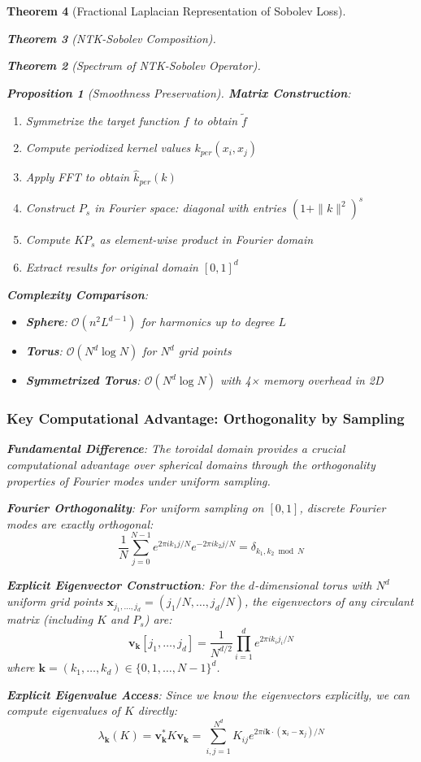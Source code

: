 \documentclass{article}
\newtheorem{theorem}{Theorem}[section]
\newtheorem{proposition}[theorem]{Proposition}
\begin{document}
\begin{theorem}[Fractional Laplacian Representation of Sobolev Loss]
\begin{theorem}[NTK-Sobolev Composition]
\begin{theorem}[Spectrum of NTK-Sobolev Operator]
\begin{proposition}[Smoothness Preservation]
\textbf{Matrix Construction}:
\begin{enumerate}
\item Symmetrize the target function $f$ to obtain $\tilde{f}$
\item Compute periodized kernel values $k_{per}(x_i, x_j)$
\item Apply FFT to obtain $\hat{k}_{per}(k)$
\item Construct $P_s$ in Fourier space: diagonal with entries $(1 + \|k\|^2)^s$
\item Compute $KP_s$ as element-wise product in Fourier domain
\item Extract results for original domain $[0,1]^d$
\end{enumerate}

\textbf{Complexity Comparison}:
\begin{itemize}
\item \textbf{Sphere}: $\mathcal{O}(n^2 L^{d-1})$ for harmonics up to degree $L$
\item \textbf{Torus}: $\mathcal{O}(N^d \log N)$ for $N^d$ grid points
\item \textbf{Symmetrized Torus}: $\mathcal{O}(N^d \log N)$ with 4× memory overhead in 2D
\end{itemize}

\subsubsection{Key Computational Advantage: Orthogonality by Sampling}

\textbf{Fundamental Difference}: The toroidal domain provides a crucial computational advantage over spherical domains through the orthogonality properties of Fourier modes under uniform sampling.

\textbf{Fourier Orthogonality}: For uniform sampling on $[0,1]$, discrete Fourier modes are exactly orthogonal:
\[ \frac{1}{N} \sum_{j=0}^{N-1} e^{2\pi i k_1 j/N} e^{-2\pi i k_2 j/N} = \delta_{k_1, k_2 \bmod N} \]

\textbf{Explicit Eigenvector Construction}:
For the $d$-dimensional torus with $N^d$ uniform grid points $\mathbf{x}_{j_1,\ldots,j_d} = (j_1/N, \ldots, j_d/N)$, the eigenvectors of any circulant matrix (including $K$ and $P_s$) are:
\[ \mathbf{v}_{\mathbf{k}}[j_1, \ldots, j_d] = \frac{1}{N^{d/2}} \prod_{i=1}^d e^{2\pi i k_i j_i/N} \]
where $\mathbf{k} = (k_1, \ldots, k_d) \in \{0, 1, \ldots, N-1\}^d$.

\textbf{Explicit Eigenvalue Access}:
Since we know the eigenvectors explicitly, we can compute eigenvalues of $K$ directly:
\[ \lambda_{\mathbf{k}}(K) = \mathbf{v}_{\mathbf{k}}^* K \mathbf{v}_{\mathbf{k}} = \sum_{i,j=1}^{N^d} K_{ij} e^{2\pi i \mathbf{k} \cdot (\mathbf{x}_i - \mathbf{x}_j)/N} \]


\end{proposition}
\end{theorem}
\end{theorem}
\end{theorem}
\end{document}
